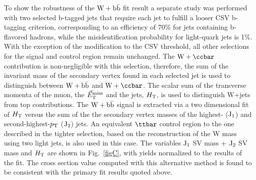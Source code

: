 To show the robustness of the $\mathrm{W+\mathrm{b\bar{b}}}$ fit result a separate study was performed with
two selected b-tagged jets that require each jet to fulfill a looser CSV b-tagging criterion, corresponding 
to an efficiency  of 70\%
for jets containing b-flavored hadrons, while the misidentification probability for light-quark jets is 1$\%$.
With the exception of the modification to the CSV threshold, all other selections for the signal
and control region remain unchanged. The $\Wcc$ contribution is non-negligible with this selection,
therefore, the sum of the invariant mass of the secondary vertex found in each selected jet
is used to distinguish between $\mathrm{W+\mathrm{b\bar{b}}}$ and $\Wcc$. The scalar sum of the transverse momenta of the
muon, the $\vec{E}_\mathrm{T}^{\mathrm{miss}}$ and the jets,
$H_{\rm{T}}$, is used to distinguish W+jets from
top contributions. 
The $\mathrm{W+\mathrm{b\bar{b}}}$ signal is extracted via a two dimensional fit of 
$H_{\rm{T}}$ versus
the sum of the the  secondary vertex masses of the highest- ($\rm{J_1}$) and second-highest-$p_\mathrm{T}$ ($\rm{J_2}$) jets. 
An equivalent $\ttbar$ control region to the one described in the
tighter selection, based on the reconstruction of the W mass using two light jets, is also used in this case.
The variables $\rm{J_1}$ SV mass + $\rm{J_2}$ SV mass and $H_{\rm{T}}$ are shown in Fig.~\ref{figC}, with yields 
normalized to the results of the fit.
The cross section value computed with this alternative method 
is found to be consistent
with the primary fit results quoted above.


